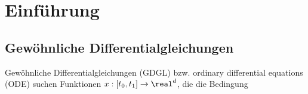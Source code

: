\chapter{Einführung}
\section{Gewöhnliche Differentialgleichungen}
Gewöhnliche Differentialgleichungen (GDGL) bzw. ordinary differential
equations (ODE) suchen Funktionen $x : [t_0, t_1] \to \real^d$, die die
Bedingung 